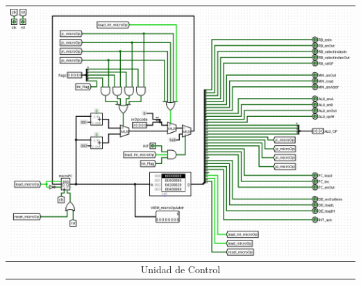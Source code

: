\documentclass[a4paper,11pt]{article}
\begin{document}
\begin{center}
\begin{tabular}[t]{c}
\includegraphics[scale=0.3]{img/8_ControlUnit.png}\\
\hline
Unidad de Control\\ \hline
\end{tabular}
\end{center}
\end{document}
